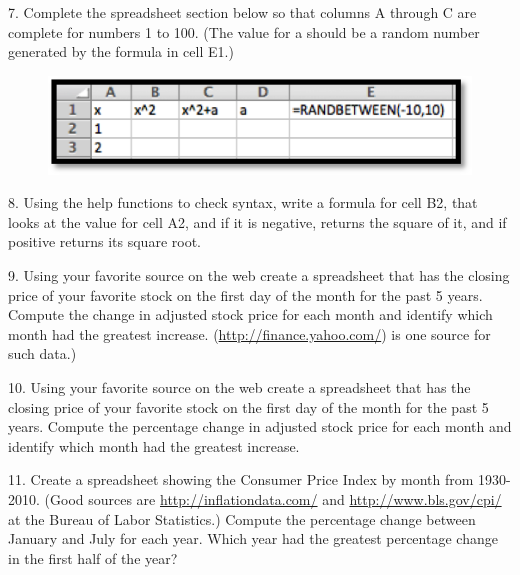 \documentclass[10pt,]{book}
\theoremstyle{plain}
\theoremstyle{definition}
\theoremstyle{definition}
\begin{document}
\begin{exerciselist}
\begin{enumerate}[label=(\Alph*)]
%
\end{enumerate}
\par\smallskip
\item[7.]\hypertarget{exercise-48}{}  Complete the spreadsheet section below so that columns A through C are complete for numbers 1 to 100.  (The value for a should be a random number generated by the formula in cell E1.)
%
\par\smallskip
\leavevmode%
\begin{figure}
\centering
\includegraphics[width=0.6\linewidth]{images/sec1-3-e5.png}
\end{figure}
\item[8.]\hypertarget{exercise-49}{}  Using the help functions to check syntax, write a formula for cell B2, that looks at the value for cell A2, and if it is negative, returns the square of it, and if positive returns its square root.
%
\par\smallskip
\item[9.]\hypertarget{exercise-50}{} Using your favorite source on the web create a spreadsheet that has the closing price of your favorite stock on the first day of the month for the past 5 years.  Compute the change in adjusted stock price for each month and identify which month had the greatest increase.  
(\href{http://finance.yahoo.com/}{http://finance.yahoo.com/}) is one source for such data.)
%
\par\smallskip
\item[10.]\hypertarget{exercise-51}{} Using your favorite source on the web create a spreadsheet that has the closing price of your favorite stock on the first day of the month for the past 5 years.  Compute the percentage change in adjusted stock price for each month and identify which month had the greatest increase.  
%
\par\smallskip
\item[11.]\hypertarget{exercise-52}{} Create a spreadsheet showing the Consumer Price Index by month from 1930-2010.  (Good sources are 
\href{http://inflationdata.com/}{http://inflationdata.com/} 
 and \href{http://www.bls.gov/cpi/}{http://www.bls.gov/cpi/} at the Bureau of Labor Statistics.)  Compute the percentage change between January and July for each year.  Which year had the greatest percentage change in the first half of the year?
%
\par\smallskip
\end{exerciselist}
\typeout{************************************************}
\typeout{************************************************}
\end{document}
